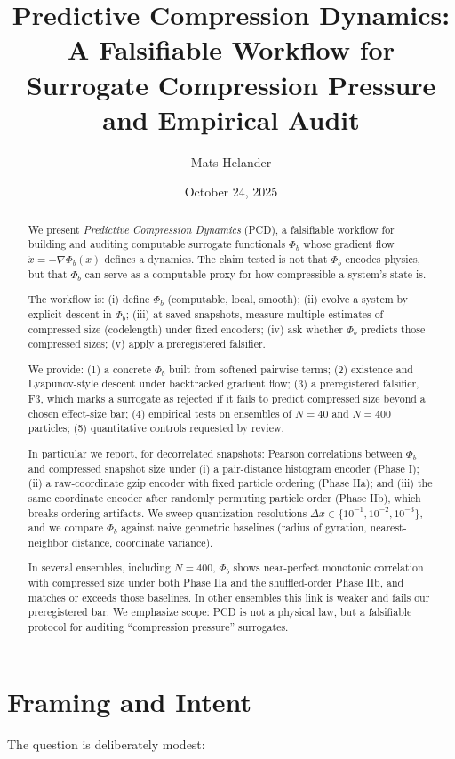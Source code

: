 \documentclass[11pt,a4paper]{article}
\title{\bf Predictive Compression Dynamics:\\
A Falsifiable Workflow for Surrogate Compression Pressure and Empirical Audit}
\author{Mats Helander}
\date{October 24, 2025}
\numberwithin{equation}{section}
\newcommand{\phib}{\Phi_b}
\begin{document}
\maketitle

\begin{abstract}
We present \emph{Predictive Compression Dynamics} (PCD), a falsifiable workflow for building and auditing computable surrogate functionals $\phib$ whose gradient flow $\dot x = -\nabla \phib(x)$ defines a dynamics. The claim tested is not that $\phib$ encodes physics, but that $\phib$ can serve as a computable proxy for how compressible a system's state is.

The workflow is: (i) define $\phib$ (computable, local, smooth); (ii) evolve a system by explicit descent in $\phib$; (iii) at saved snapshots, measure multiple estimates of compressed size (codelength) under fixed encoders; (iv) ask whether $\phib$ predicts those compressed sizes; (v) apply a preregistered falsifier.

We provide: (1) a concrete $\phib$ built from softened pairwise terms; (2) existence and Lyapunov-style descent under backtracked gradient flow; (3) a preregistered falsifier, F3, which marks a surrogate as rejected if it fails to predict compressed size beyond a chosen effect-size bar; (4) empirical tests on ensembles of $N{=}40$ and $N{=}400$ particles; (5) quantitative controls requested by review.

In particular we report, for decorrelated snapshots: Pearson correlations between $\phib$ and compressed snapshot size under (i) a pair-distance histogram encoder (Phase I); (ii) a raw-coordinate gzip encoder with fixed particle ordering (Phase IIa); and (iii) the same coordinate encoder after randomly permuting particle order (Phase IIb), which breaks ordering artifacts. We sweep quantization resolutions $\Delta x \in \{10^{-1},10^{-2},10^{-3}\}$, and we compare $\phib$ against naive geometric baselines (radius of gyration, nearest-neighbor distance, coordinate variance).

In several ensembles, including $N{=}400$, $\phib$ shows near-perfect monotonic correlation with compressed size under both Phase IIa and the shuffled-order Phase IIb, and matches or exceeds those baselines. In other ensembles this link is weaker and fails our preregistered bar. We emphasize scope: PCD is not a physical law, but a falsifiable protocol for auditing ``compression pressure'' surrogates.
\end{abstract}

\section{Framing and Intent}
The question is deliberately modest:
\end{document}
